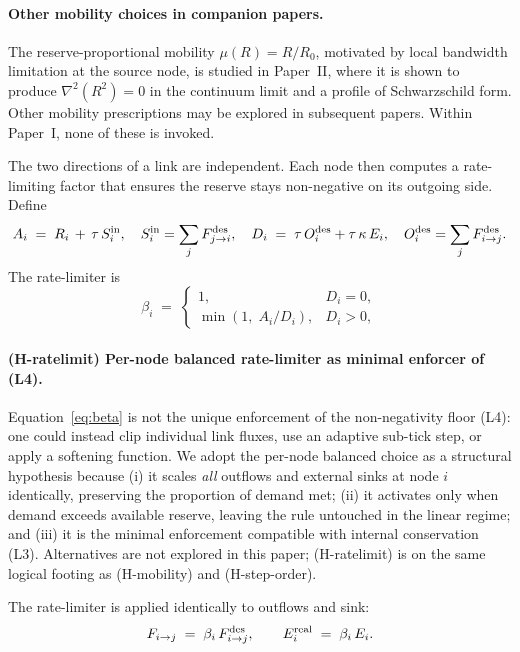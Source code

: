 \documentclass[11pt,a4paper]{article}
\begin{document}
\paragraph{Other mobility choices in companion papers.} The
reserve-proportional mobility $\mu(R) = R/R_0$, motivated by
local bandwidth limitation at the source node, is studied in
Paper~II, where it is shown to produce $\nabla^2(R^2) = 0$ in
the continuum limit and a profile of Schwarzschild form. Other
mobility prescriptions may be explored in subsequent papers.
Within Paper~I, none of these is invoked.

The two directions of a link are independent. Each node then
computes a rate-limiting factor that ensures the reserve stays
non-negative on its outgoing side. Define
\begin{equation}
A_i \;=\; R_i \,+\, \tau\, S_i^{\rm in},
\quad
S_i^{\rm in} = \sum_j F_{j \to i}^{\rm des},
\quad
D_i \;=\; \tau\, O_i^{\rm des} + \tau\, \kappa\, E_i,
\quad
O_i^{\rm des} = \sum_j F_{i \to j}^{\rm des}.
\label{eq:budgets}
\end{equation}
The rate-limiter is
\begin{equation}
\beta_i \;=\;
\begin{cases}
1, & D_i = 0,\\[2pt]
\min\!\left(1,\; A_i / D_i \right), & D_i > 0,
\end{cases}
\label{eq:beta}
\end{equation}

\paragraph{(H-ratelimit) Per-node balanced rate-limiter as
minimal enforcer of (L4).}
Equation~\eqref{eq:beta} is not the unique enforcement of the
non-negativity floor (L4): one could instead clip individual
link fluxes, use an adaptive sub-tick step, or apply a
softening function. We adopt the per-node balanced choice as a
structural hypothesis because (i) it scales \emph{all} outflows
and external sinks at node $i$ identically, preserving the
proportion of demand met; (ii) it activates only when demand
exceeds available reserve, leaving the rule untouched in the
linear regime; and (iii) it is the minimal enforcement
compatible with internal conservation (L3). Alternatives are
not explored in this paper; (H-ratelimit) is on the same
logical footing as (H-mobility) and (H-step-order).

The rate-limiter is applied identically to outflows and sink:
\begin{equation}
F_{i \to j} \;=\; \beta_i\, F_{i \to j}^{\rm des},
\qquad
E_i^{\rm real} \;=\; \beta_i\, E_i.
\label{eq:flux}
\end{equation}
\end{document}
